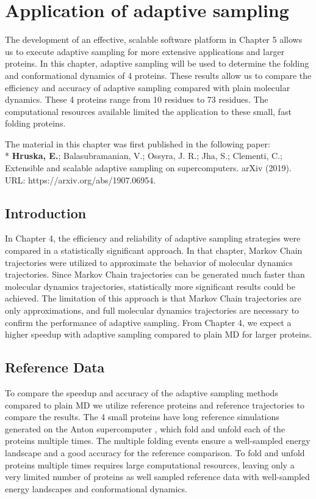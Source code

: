\afterpage{\null\newpage}
\chapter{Application of adaptive sampling\label{ch:chapter5}}

The development of an effective, scalable software platform in Chapter 5 allows us to execute adaptive sampling for more extensive applications and larger proteins.
In this chapter, adaptive sampling will be used to determine the folding and conformational dynamics of 4 proteins. These results allow us to compare the efficiency and accuracy of adaptive sampling compared with plain molecular dynamics.  These 4 proteins range from 10 residues to 73 residues. The computational resources available limited the application to these small, fast folding proteins. 

The material in this chapter was first published in the following paper: 
\\*
\cite{Extasy2019} \textbf{Hruska, E.}; Balasubramanian, V.; Ossyra, J. R.; Jha, S.; Clementi, C.; Extensible
and scalable adaptive sampling on supercomputers. arXiv (2019). URL: https://arxiv.org/abs/1907.06954.


\section{\label{sec:intro5}Introduction}
  
In Chapter 4, the efficiency and reliability of adaptive sampling strategies were compared in a statistically significant approach.  In that chapter, Markov Chain trajectories were utilized to approximate the behavior of molecular dynamics trajectories. Since Markov Chain trajectories can be generated much faster than molecular dynamics trajectories, statistically more significant results could be achieved. The limitation of this approach is that Markov Chain trajectories are only approximations, and full molecular dynamics trajectories are necessary to confirm the performance of adaptive sampling. From Chapter 4, we expect a higher speedup with adaptive sampling\cite{Adstrategies2018} compared to plain MD for larger proteins.

\section{\label{sec:Reference}Reference Data}



To compare the speedup and accuracy of the adaptive sampling methods compared to plain MD we utilize reference proteins and reference trajectories to compare the results.
The 4 small proteins have long reference simulations generated on the Anton supercomputer \cite{lindorff2011}, which fold and unfold each of the proteins multiple times. The multiple folding events ensure a well-sampled energy landscape and a good accuracy for the reference comparison. To fold and unfold proteins multiple times requires large computational resources, leaving only a very limited number of proteins as well sampled reference data with well-sampled energy landscapes and conformational dynamics.


